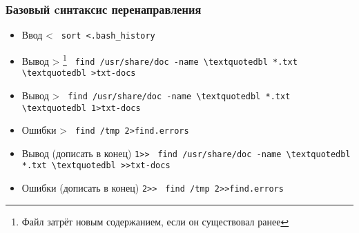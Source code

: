 \begin{frame}[fragile]
  \frametitle{Базовый cинтаксис перенаправления}
  \begin{itemize}    
    \item \alert{Ввод} \textquotedbl < \textquotedbl \newline
      \verb+ sort <.bash_history+ \pause
    \item \alert{Вывод} \textquotedbl > \textquotedbl \footnote{Файл затрёт новым содержанием, если он существовал ранее} \newline
      \verb+ find /usr/share/doc -name \textquotedbl *.txt \textquotedbl >txt-docs+    
    \item \alert{Вывод} > \textquotedbl \newline
      \verb+ find /usr/share/doc -name \textquotedbl *.txt \textquotedbl 1>txt-docs+ \pause
    \item \alert{Ошибки} > \textquotedbl \newline
      \verb+ find /tmp 2>find.errors+ \pause
    \item \alert{Вывод (дописать в конец)} \textquotedbl \verb+1>>+ \textquotedbl \newline
      \verb+ find /usr/share/doc -name \textquotedbl *.txt \textquotedbl >>txt-docs+
    \item \alert{Ошибки (дописать в конец)} \textquotedbl \verb+2>>+ \textquotedbl \newline 
      \verb+ find /tmp 2>>find.errors+ \pause
  \end{itemize}
\end{frame}
